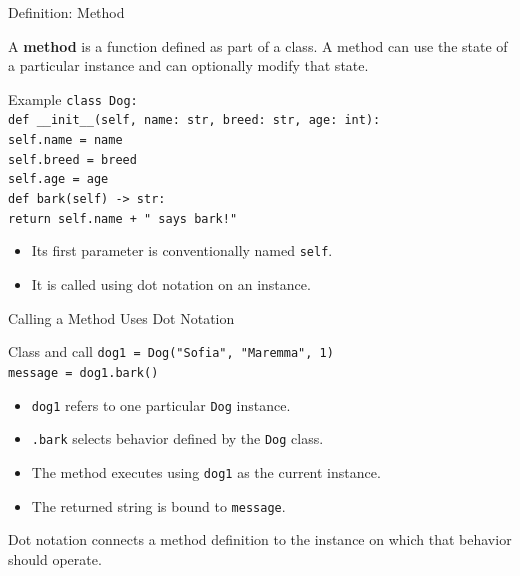 \documentclass[aspectratio=169,10pt]{beamer}
\begin{document}
\begin{frame}{Definition: Method}
  \small
  \begin{cpdefinition}
    A \textbf{method} is a function defined as part of a class. A method can use the state of a particular instance and can optionally modify that state.
  \end{cpdefinition}

  \begin{block}{Example}
    \texttt{class Dog:}\\
    \hspace*{0.20in}\texttt{def \_\_init\_\_(self, name: str, breed: str, age: int):}\\
    \hspace*{0.40in}\texttt{self.name = name}\\
    \hspace*{0.40in}\texttt{self.breed = breed}\\
    \hspace*{0.40in}\texttt{self.age = age}\\
    \hspace*{0.20in}\texttt{def bark(self) -> str:}\\
    \hspace*{0.40in}\texttt{return self.name + " says bark!"}
  \end{block}

  \begin{itemize}
    \item Its first parameter is conventionally named \texttt{self}.
    \item It is called using dot notation on an instance.
  \end{itemize}
\end{frame}

\begin{frame}{Calling a Method Uses Dot Notation}
  \begin{block}{Class and call}
    \texttt{dog1 = Dog("Sofia", "Maremma", 1)}\\[0.08in]
    \texttt{message = dog1.bark()}
  \end{block}

  \begin{itemize}
    \item \texttt{dog1} refers to one particular \texttt{Dog} instance.
    \item \texttt{.bark} selects behavior defined by the \texttt{Dog} class.
    \item The method executes using \texttt{dog1} as the current instance.
    \item The returned string is bound to \texttt{message}.
  \end{itemize}

  \begin{keyidea}
    Dot notation connects a method definition to the instance on which that behavior should operate.
  \end{keyidea}
\end{frame}
\end{document}
